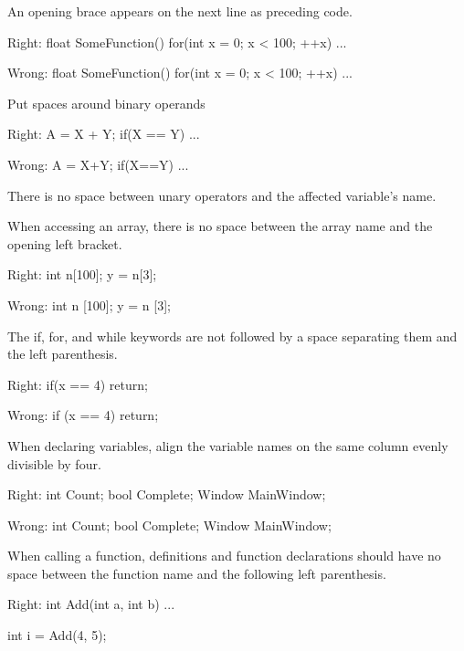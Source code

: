\item
An opening brace appears on the next line as preceding code.

Right:
\startCodeExample
float SomeFunction()
{
    for(int x = 0; x < 100; ++x)
    {
        ...
    }
}
\stopCodeExample

Wrong:
\startCodeExample
float SomeFunction() {
    for(int x = 0; x < 100; ++x) {
        ...
    }
}
\stopCodeExample

\item
Put spaces around binary operands

Right:
\startCodeExample
A = X + Y;
if(X == Y)
    ...
\stopCodeExample

Wrong:
\startCodeExample
A = X+Y;
if(X==Y)
    ...
\stopCodeExample

\item
There is no space between unary operators and the affected variable's name.

\item
When accessing an array, there is no space between the array name and the opening left bracket. 

Right:
\startCodeExample
int n[100];
y = n[3];
\stopCodeExample

Wrong:
\startCodeExample
int n [100];
y = n [3];
\stopCodeExample

\item
The if, for, and while keywords are not followed by a space separating them and the left parenthesis. 

Right:
\startCodeExample
if(x == 4)
    return;
\stopCodeExample

Wrong:
\startCodeExample
if (x == 4)
    return;
\stopCodeExample

\item
When declaring variables, align the variable names on the same column evenly divisible by four.

Right:
\startCodeExample
int     Count;
bool    Complete;
Window  MainWindow;
\stopCodeExample

Wrong:
\startCodeExample
int Count;
bool Complete;
Window MainWindow;
\stopCodeExample

\item
When calling a function, definitions and function declarations should have no space between the function name and the following left parenthesis.

Right:
\startCodeExample
int Add(int a, int b)
{ 
    ... 
}

int i = Add(4, 5);
\stopCodeExample

